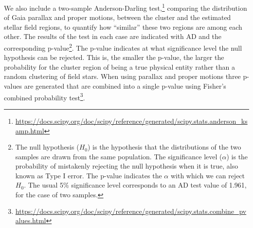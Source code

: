 \documentclass[draft]{aa}
\begin{document}
We also include a two-sample Anderson-Darling
test,\footnote{\url{https://docs.scipy.org/doc/scipy/reference/generated/scipy.stats.anderson_ksamp.html}}
comparing the distribution of Gaia parallax and proper motions,
between the cluster and the estimated stellar field regions, to quantify how
``similar'' these two regions are among each other.
The results of the test in each case are indicated with AD and the
corresponding p-value\footnote{The null hypothesis ($H_{0}$) is the
hypothesis that the distributions of the two samples are drawn from the same
population. The significance level ($\alpha$) is the probability of mistakenly
rejecting the null hypothesis when it is true, also known as Type I error. The
p-value indicates the $\alpha$ with which we can reject $H_{0}$. The usual 5\%
significance level corresponds to an AD test value of 1.961, for the case of two
samples.}. The p-value indicates at what significance level the null hypothesis
can be rejected. This is, the smaller the p-value, the larger the probability
for the cluster region of being a true physical entity rather than a random
clustering of field stars. When using parallax and proper motions three
p-values are generated that are combined into a single p-value using Fisher's
combined probability
test\footnote{\url{https://docs.scipy.org/doc/scipy/reference/generated/scipy.stats.combine_pvalues.html}}.









\end{document}
